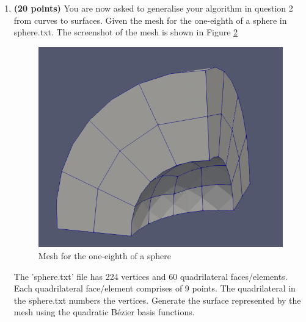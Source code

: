 \documentclass[a4paper, 11pt]{article}
\begin{document}
\begin{enumerate}
\begin{figure}[ht]
\label{fig:BeziercurveQ2}
\end{figure}
\item \textbf{(20 points)} You are now asked to generalise your algorithm in question 2 from curves to surfaces. Given the mesh for the one-eighth of a sphere in sphere.txt. The screenshot of the mesh is shown in Figure \ref{fig:sphereFig}
\begin{figure}
\includegraphics[scale=0.35]{resources/sphere.png} 
\centering
\caption{Mesh for the one-eighth of a sphere}
\label{fig:sphereFig}
\end{figure}
The 'sphere.txt' file has 224 vertices and 60 quadrilateral faces/elements. Each quadrilateral face/element comprises of 9 points. The quadrilateral in the sphere.txt numbers the vertices. Generate the surface represented by the mesh  using the quadratic B\'{e}zier basis functions.

\end{enumerate}
\end{document}
